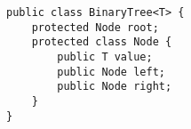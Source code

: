 \begin{lstlisting}
public class BinaryTree<T> {
    protected Node root;
    protected class Node {
        public T value;
        public Node left;
        public Node right;
    }
}
\end{lstlisting}